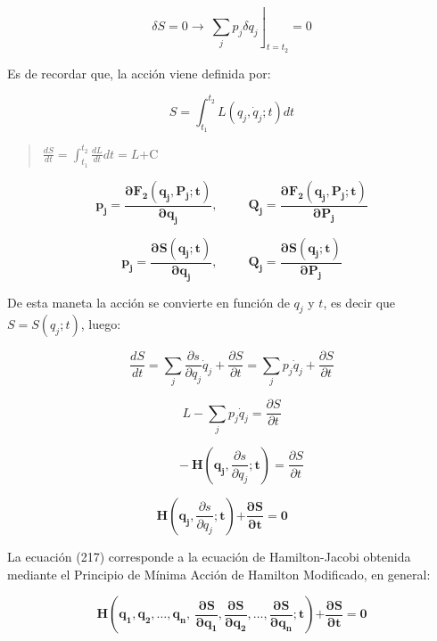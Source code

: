 \documentclass[]{article}
\begin{document}
\[\delta S = 0 \rightarrow \left. \ \sum_{j}^{}{p_{j}\delta q_{j}} \right\rfloor_{t = t_{2}} = 0\]

Es de recordar que, la acción viene definida por:

\[S = \int_{t_{1}}^{t_{2}}L\left( q_{j},{\dot{q}}_{j};t \right)dt\]

\begin{quote}
\(\frac{dS}{dt} = \int_{t_{1}}^{t_{2}}{\frac{dL}{dt}dt} = L\)+C
\end{quote}

\[\mathbf{p}_{\mathbf{j}}\mathbf{=}\frac{\mathbf{\partial}\mathbf{F}_{\mathbf{2}}\left( \mathbf{q}_{\mathbf{j}}\mathbf{,}\mathbf{P}_{\mathbf{j}}\mathbf{;t} \right)}{\mathbf{\partial}\mathbf{q}_{\mathbf{j}}}\mathbf{,\ \ \ \ \ \ \ \ \ \ \ }\mathbf{Q}_{\mathbf{j}}\mathbf{=}\frac{\mathbf{\partial}\mathbf{F}_{\mathbf{2}}\left( \mathbf{q}_{\mathbf{j}}\mathbf{,}\mathbf{P}_{\mathbf{j}}\mathbf{;t} \right)}{\mathbf{\partial}\mathbf{P}_{\mathbf{j}}}\]

\[\mathbf{p}_{\mathbf{j}}\mathbf{=}\frac{\mathbf{\partial S}\left( \mathbf{q}_{\mathbf{j}}\mathbf{;t} \right)}{\mathbf{\partial}\mathbf{q}_{\mathbf{j}}}\mathbf{,\ \ \ \ \ \ \ \ \ \ \ }\mathbf{Q}_{\mathbf{j}}\mathbf{=}\frac{\mathbf{\partial S}\left( \mathbf{q}_{\mathbf{j}}\mathbf{;t} \right)}{\mathbf{\partial}\mathbf{P}_{\mathbf{j}}}\]

De esta maneta la acción se convierte en función de \(q_{j}\) y \(t\),
es decir que \(S = S\left( q_{j};t \right)\), luego:

\[\frac{dS}{dt} = \sum_{j}^{}{\frac{\partial s}{\partial q_{j}}{\dot{q}}_{j}} + \frac{\partial S}{\partial t} = \sum_{j}^{}{p_{j}{\dot{q}}_{j}} + \frac{\partial S}{\partial t}\]

\[L - \sum_{j}^{}{p_{j}{\dot{q}}_{j}} = \frac{\partial S}{\partial t}\]

\[\mathbf{\ \ \ \ \ \ } - \mathbf{H}\left( \mathbf{q}_{\mathbf{j}}\mathbf{,}\frac{\partial s}{\partial q_{j}}\mathbf{;t} \right) = \frac{\partial S}{\partial t}\]

\[\mathbf{H}\left( \mathbf{q}_{\mathbf{j}}\mathbf{,}\frac{\partial s}{\partial q_{j}}\mathbf{;t} \right)\mathbf{+}\frac{\mathbf{\partial S}}{\mathbf{\partial t}}\mathbf{= 0\ \ \ \ \ \ \ }\]

La ecuación (217) corresponde a la ecuación de Hamilton-Jacobi obtenida
mediante el Principio de Mínima Acción de Hamilton Modificado, en
general:

\[\mathbf{H}\left( \mathbf{q}_{\mathbf{1}}\mathbf{,}\mathbf{q}_{\mathbf{2}}\mathbf{,\ldots,}\mathbf{q}_{\mathbf{n}}\mathbf{,\ }\frac{\mathbf{\partial S}}{\mathbf{\partial}\mathbf{q}_{\mathbf{1}}}\mathbf{,}\frac{\mathbf{\partial S}}{\mathbf{\partial}\mathbf{q}_{\mathbf{2}}}\mathbf{,\ldots,}\frac{\mathbf{\partial S}}{\mathbf{\partial}\mathbf{q}_{\mathbf{n}}}\mathbf{;t} \right)\mathbf{+}\frac{\mathbf{\partial S}}{\mathbf{\partial t}}\mathbf{= 0}\]
\end{document}
